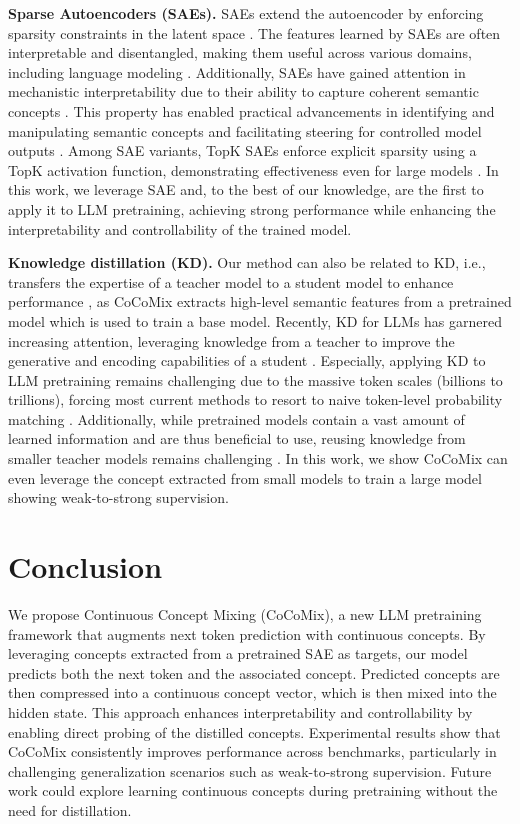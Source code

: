 \documentclass[]{fairmeta}
\newcommand{\mname}{Continuous Concept Mixing (CoCoMix)\xspace}
\newcommand{\sname}{CoCoMix\xspace}
\begin{document}
\textbf{Sparse Autoencoders (SAEs).} SAEs extend the autoencoder by enforcing sparsity constraints in the latent space \citep{lee2006efficient}. The features learned by SAEs are often interpretable and disentangled, making them useful across various domains, including language modeling \citep{bricken2023monosemanticity}. Additionally, SAEs have gained attention in mechanistic interpretability due to their ability to capture coherent semantic concepts \citep{marks2024sparse}. This property has enabled practical advancements in identifying and manipulating semantic concepts and facilitating steering for controlled model outputs \citep{lieberum2024gemma}. Among SAE variants, TopK SAEs \citep{makhzani2014k} enforce explicit sparsity using a TopK activation function, demonstrating effectiveness even for large models \citep{gao2024scaling}. In this work, we leverage SAE and, to the best of our knowledge, are the first to apply it to LLM pretraining, achieving strong performance while enhancing the interpretability and controllability of the trained model.

\textbf{Knowledge distillation (KD).} 
Our method can also be related to KD, i.e., transfers the expertise of a teacher model to a student model to enhance performance \citep{hinton2015distilling,zagoruyko2017paying}, as \sname extracts high-level semantic features from a pretrained model which is used to train a base model. Recently, KD for LLMs has garnered increasing attention, leveraging knowledge from a teacher to improve the generative and encoding capabilities of a student \citep{sanh2019distilbert,ko2024distillm}. Especially, applying KD to LLM pretraining remains challenging due to the massive token scales (billions to trillions), forcing most current methods to resort to naive token-level probability matching  \citep{team2024gemma,gu2024miniplm}. Additionally, while pretrained models contain a vast amount of learned information and are thus beneficial to use, reusing knowledge from smaller teacher models remains challenging \citep{burns2023weak}. In this work, we show \sname can even leverage the concept extracted from small models to train a large model showing weak-to-strong supervision. 


\section{Conclusion}
\label{sec:con}

We propose \mname, a new LLM pretraining framework that augments next token prediction with continuous concepts. By leveraging concepts extracted from a pretrained SAE as targets, our model predicts both the next token and the associated concept. Predicted concepts are then compressed into a continuous concept vector, which is then mixed into the hidden state. This approach enhances interpretability and controllability by enabling direct probing of the distilled concepts. Experimental results show that \sname consistently improves performance across benchmarks, particularly in challenging generalization scenarios such as weak-to-strong supervision. Future work could explore learning continuous concepts during pretraining without the need for distillation. 
\end{document}
